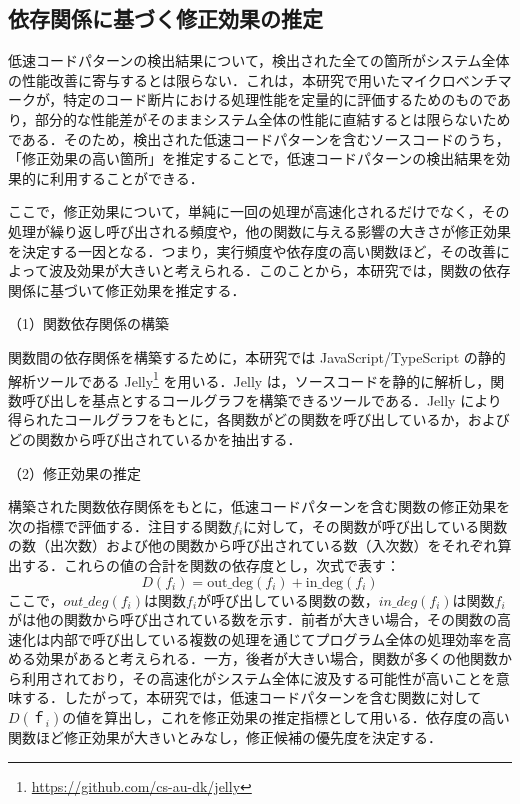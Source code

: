 \documentclass[submit,techrep,noauthor]{ipsj}
\begin{document}
\subsection{依存関係に基づく修正効果の推定}
低速コードパターンの検出結果について，検出された全ての箇所がシステム全体の性能改善に寄与するとは限らない．これは，本研究で用いたマイクロベンチマークが，特定のコード断片における処理性能を定量的に評価するためのものであり，部分的な性能差がそのままシステム全体の性能に直結するとは限らないためである．そのため，検出された低速コードパターンを含むソースコードのうち，「修正効果の高い箇所」を推定することで，低速コードパターンの検出結果を効果的に利用することができる．

ここで，修正効果について，単純に一回の処理が高速化されるだけでなく，その処理が繰り返し呼び出される頻度や，他の関数に与える影響の大きさが修正効果を決定する一因となる．つまり，実行頻度や依存度の高い関数ほど，その改善によって波及効果が大きいと考えられる．このことから，本研究では，関数の依存関係に基づいて修正効果を推定する．

（1）関数依存関係の構築

関数間の依存関係を構築するために，本研究では JavaScript/TypeScript の静的解析ツールである Jelly\footnote{\url{https://github.com/cs-au-dk/jelly}} を用いる．Jelly は，ソースコードを静的に解析し，関数呼び出しを基点とするコールグラフを構築できるツールである．Jelly により得られたコールグラフをもとに，各関数がどの関数を呼び出しているか，およびどの関数から呼び出されているかを抽出する．

（2）修正効果の推定

構築された関数依存関係をもとに，低速コードパターンを含む関数の修正効果を次の指標で評価する．注目する関数$ f_i $に対して，その関数が呼び出している関数の数（出次数）および他の関数から呼び出されている数（入次数）をそれぞれ算出する．これらの値の合計を関数の依存度とし，次式で表す：
\begin{equation}
D(f_i) = \mathrm{out\_deg}(f_i) + \mathrm{in\_deg}(f_i)
\end{equation}
ここで，$ out\_deg(f_i) $は関数$ f_i $が呼び出している関数の数，$ in\_deg(f_i) $は関数$ f_i $がは他の関数から呼び出されている数を示す．前者が大きい場合，その関数の高速化は内部で呼び出している複数の処理を通じてプログラム全体の処理効率を高める効果があると考えられる．一方，後者が大きい場合，関数が多くの他関数から利用されており，その高速化がシステム全体に波及する可能性が高いことを意味する．したがって，本研究では，低速コードパターンを含む関数に対して$ D(ｆ_i) $の値を算出し，これを修正効果の推定指標として用いる．依存度の高い関数ほど修正効果が大きいとみなし，修正候補の優先度を決定する．
\end{document}
